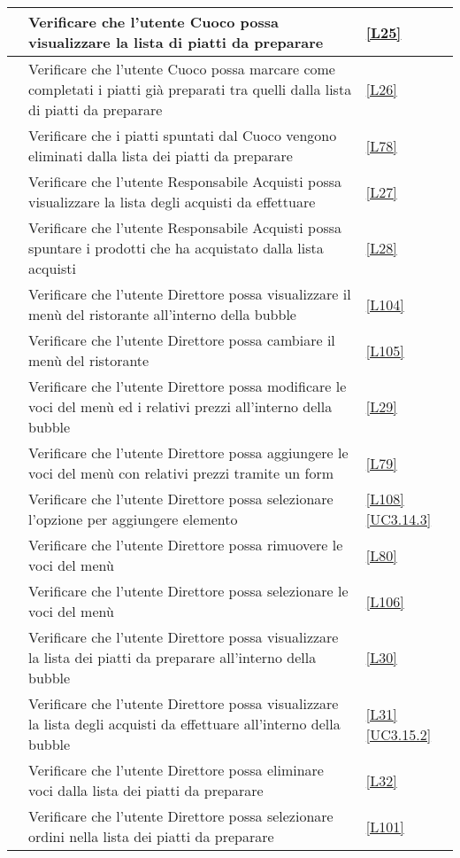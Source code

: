 \begin{longtable}{|P{5cm}|P{5cm}|P{5cm}|}
	\hline {} & Verificare che l'utente Cuoco possa visualizzare la lista di piatti da preparare & \ref{L25} \\
	\hline {} & Verificare che l'utente Cuoco possa marcare come completati i piatti già preparati tra quelli dalla lista di piatti da preparare  & \ref{L26} \\
	\hline {} & Verificare che i piatti spuntati dal Cuoco vengono eliminati dalla lista dei piatti da preparare & \ref{L78} \\
	\hline {} & Verificare che l'utente Responsabile Acquisti possa visualizzare la lista degli acquisti da effettuare & \ref{L27} \\
	\hline {} & Verificare che l'utente Responsabile Acquisti possa spuntare i prodotti che ha acquistato dalla lista acquisti & \ref{L28} \\
	\hline {} & Verificare che l'utente Direttore possa visualizzare il menù del ristorante all’interno della bubble & \ref{L104}  \\
	\hline {} & Verificare che l'utente Direttore possa cambiare il menù del ristorante & \ref{L105} \\
	\hline {} & Verificare che l'utente Direttore possa modificare le voci del menù ed i relativi prezzi all’interno della bubble & \ref{L29} \\
	\hline {} & Verificare che l'utente Direttore possa aggiungere le voci del menù con relativi prezzi tramite un form & \ref{L79} \\
	\hline {} & Verificare che l'utente Direttore possa selezionare l'opzione per aggiungere elemento & \ref{L108} \ref{UC3.14.3}\\
	\hline {} & Verificare che l'utente Direttore possa rimuovere le voci del menù & \ref{L80} \\
	\hline {} & Verificare che l'utente Direttore possa selezionare le voci del menù & \ref{L106} \\
	\hline {} & Verificare che l'utente Direttore possa visualizzare la lista dei piatti da preparare all’interno della bubble & \ref{L30} \\
	\hline {} & Verificare che l'utente Direttore possa visualizzare la lista degli acquisti da effettuare all’interno della bubble & \ref{L31} \ref{UC3.15.2} \\
	\hline {} & Verificare che l'utente Direttore possa eliminare voci dalla lista dei piatti da preparare & \ref{L32} \\
	\hline {} & Verificare che l'utente Direttore possa selezionare ordini nella lista dei piatti da preparare & \ref{L101} \\

\end{longtable}
